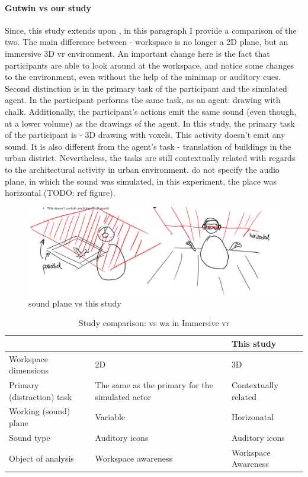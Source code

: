 \paragraph{Gutwin vs our study}
Since, this study extends upon \cite{gutwin_chalk_2011}, in this paragraph I provide a comparison of the two.
The main difference between - workspace is no longer a 2D plane, but an immersive 3D \gls{vr} environment. An important change here is the fact that participants are able to look around at the workspace, and notice some changes to the environment, even without the help of the minimap or auditory cues.
Second distinction is in the primary task of the participant and the simulated agent. In \cite{gutwin_chalk_2011} the participant performs the same task, as an agent: drawing with chalk. Additionally, the participant's actions emit the same sound (even though, at a lower volume) as the drawings of the agent. In this study, the primary task of the participant is - 3D drawing with voxels. This activity doesn't emit any sound. It is also different from the agent's task - translation of buildings in the urban district. Nevertheless, the tasks are still contextually related with regards to the architectural activity in urban environment.
\cite{gutwin_chalk_2011} do not specify the audio plane, in which the sound was simulated, in this experiment, the place was horizontal (TODO: ref figure). 

\begin{figure}[h]
	\centering
	\includegraphics[width=0.7\linewidth]{figures/gutwin_vs_my_study_sound_plane}
	\caption{\cite{gutwin_chalk_2011} sound plane vs this study}
	\label{fig:gutwinvsmystudysoundplane}
\end{figure}


\begin{table}[]
  \caption{Study comparison: \cite{gutwin_chalk_2011} vs \gls{wa} in Immersive \gls{vr}}
  \label{table:study_comp}
  \begin{tabular}{|l|l|l|}
  \hline
                             & \cite{gutwin_chalk_2011}                & This study           \\ \hline
  Workspace dimensions				 & 2D									   & 3D \\ \hline
  Primary (distraction) task & The same as the primary for the simulated actor & Contextually related \\ \hline
  Working (sound) plane      & Variable             & Horizonatal          \\ \hline
  Sound type                 & Auditory icons        & Auditory icons       \\ \hline
  Object of analysis         & Workspace awareness   & Workspace Awareness  \\ \hline
  \end{tabular}
\end{table}

